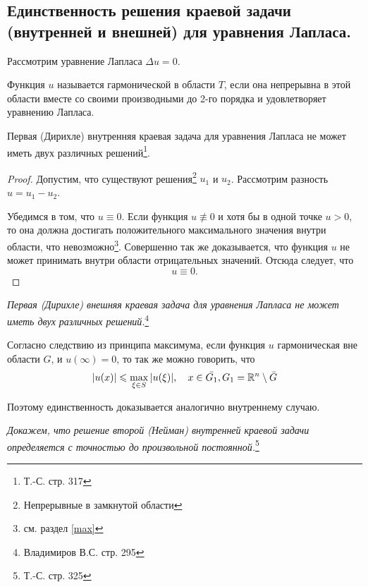 \subsection{Единственность решения краевой задачи (внутренней и внешней) для уравнения Лапласа.}

Рассмотрим уравнение Лапласа $\Delta u = 0$.

Функция $u$ называется гармонической в области $T$, если она непрерывна в этой области вместе со своими производными до 2-го порядка и удовлетворяет уравнению Лапласа. 

\begin{theorem}
	Первая (Дирихле) внутренняя краевая задача для уравнения Лапласа не может иметь двух различных решений\footnote{Т.-С. стр. 317}.
\end{theorem}


\begin{proof}
	Допустим, что существуют решения\footnote{Непрерывные в замкнутой области} $u_1$ и $u_2$. Рассмотрим разность $u = u_1 - u_2$.
	
	Убедимся в том, что $u \equiv 0$. Если функция $u \not \equiv 0$ и хотя бы в одной точке $u > 0$, то она должна достигать положительного максимального значения внутри области, что невозможно\footnote{см. раздел \ref{max}}. Совершенно так же доказывается, что функция $u$ не может принимать внутри области отрицательных значений. Отсюда следует, что 
	\begin{equation*}
		u \equiv 0.
	\end{equation*}
\end{proof}


\textit{Первая (Дирихле) внешняя краевая задача для уравнения Лапласа не может иметь двух различных решений}.\footnote{Владимиров В.С. стр. 295}

Согласно следствию из принципа максимума, если функция $u$ гармоническая вне области $G$, и $u(\infty) = 0$, то так же можно говорить, что 
\begin{equation*}
	\abs{u(x)} \leqslant \max\limits_{\xi \in S}{\abs{u(\xi)}}, \quad x \in \bar{G_1}, G_1 = \mathbb{R}^n \setminus \bar{G}  
\end{equation*}

Поэтому единственность доказывается аналогично внутреннему случаю. 

\textit{Докажем, что решение второй (Нейман) внутренней краевой задачи определяется с точностью до произвольной постоянной.}\footnote{Т.-С. стр. 325}

